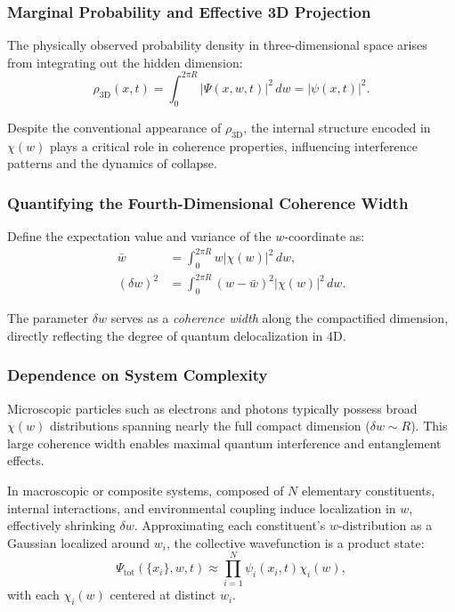 \documentclass[12pt]{article}
\begin{document}
\subsubsection*{Marginal Probability and Effective 3D Projection}

The physically observed probability density in three-dimensional space arises from integrating out the hidden dimension:
\begin{equation}
\rho_{\mathrm{3D}}(x, t) = \int_0^{2\pi R} |\Psi(x, w, t)|^2 \, dw = |\psi(x, t)|^2.
\label{eq:marginal_probability}
\end{equation}

Despite the conventional appearance of \(\rho_{\mathrm{3D}}\), the internal structure encoded in \(\chi(w)\) plays a critical role in coherence properties, influencing interference patterns and the dynamics of collapse.

\subsubsection*{Quantifying the Fourth-Dimensional Coherence Width}

Define the expectation value and variance of the \(w\)-coordinate as:
\begin{align}
\bar{w} &= \int_0^{2\pi R} w |\chi(w)|^2 \, dw, \label{eq:w_mean} \\
(\delta w)^2 &= \int_0^{2\pi R} (w - \bar{w})^2 |\chi(w)|^2 \, dw. \label{eq:w_variance_def}
\end{align}

The parameter \(\delta w\) serves as a \emph{coherence width} along the compactified dimension, directly reflecting the degree of quantum delocalization in 4D.

\subsubsection*{Dependence on System Complexity}

Microscopic particles such as electrons and photons typically possess broad \(\chi(w)\) distributions spanning nearly the full compact dimension (\(\delta w \sim R\)). This large coherence width enables maximal quantum interference and entanglement effects.

In macroscopic or composite systems, composed of \(N\) elementary constituents, internal interactions, and environmental coupling induce localization in \(w\), effectively shrinking \(\delta w\). Approximating each constituent’s \(w\)-distribution as a Gaussian localized around \(w_i\), the collective wavefunction is a product state:
\begin{equation}
\Psi_{\mathrm{tot}}(\{x_i\}, w, t) \approx \prod_{i=1}^N \psi_i(x_i, t) \chi_i(w),
\label{eq:composite_state}
\end{equation}
with each \(\chi_i(w)\) centered at distinct \(w_i\).
\end{document}
